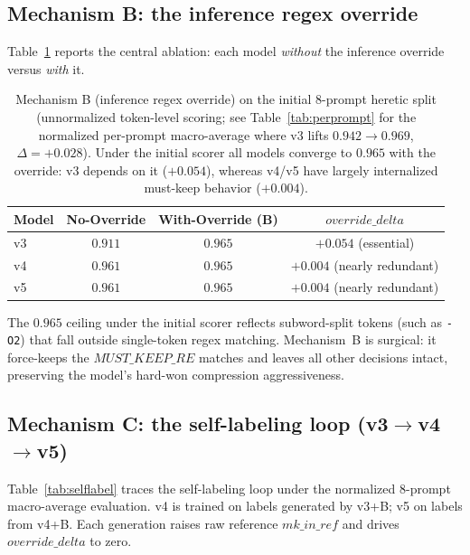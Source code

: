 \subsection{Mechanism B: the inference regex override}
\label{sec:eval:B}

Table~\ref{tab:override} reports the central ablation: each model
\emph{without} the inference override versus \emph{with} it.

\begin{table}[h]
\centering
\caption{Mechanism B (inference regex override) on the initial 8-prompt heretic
split (unnormalized token-level scoring; see Table~\ref{tab:perprompt} for the
normalized per-prompt macro-average where v3 lifts $0.942\to0.969$,
$\Delta{=}{+}0.028$). Under the initial scorer all models converge to $0.965$
with the override: v3 depends on it ($+0.054$), whereas v4/v5 have largely
internalized must-keep behavior ($+0.004$).}
\label{tab:override}
\begin{tabular}{lccc}
\toprule
Model & No-Override & With-Override (B) & $\mathit{override\_delta}$ \\
\midrule
v3 & $0.911$ & $\mathbf{0.965}$ & $+0.054$ (essential) \\
v4 & $0.961$ & $\mathbf{0.965}$ & $+0.004$ (nearly redundant) \\
v5 & $0.961$ & $\mathbf{0.965}$ & $+0.004$ (nearly redundant) \\
\bottomrule
\end{tabular}
\end{table}

The $0.965$ ceiling under the initial scorer reflects subword-split tokens
(such as \texttt{-O2}) that fall outside single-token regex matching.
Mechanism~B is surgical: it force-keeps the
$\mathit{MUST\_KEEP\_RE}$ matches and leaves all other decisions intact,
preserving the model's hard-won compression aggressiveness.

\subsection{Mechanism C: the self-labeling loop (v3$\to$v4$\to$v5)}
\label{sec:eval:C}

Table~\ref{tab:selflabel} traces the self-labeling loop under the normalized
8-prompt macro-average evaluation. v4 is trained on labels generated by v3+B;
v5 on labels from v4+B. Each generation raises raw reference
$\mathit{mk\_in\_ref}$ and drives $\mathit{override\_delta}$ to zero.

